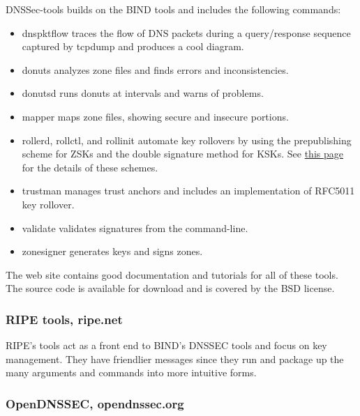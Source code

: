 DNSSec-tools builds on the BIND tools and includes the following
commands:

\begin{itemize}
\item
  {dnspktflow} traces the flow of DNS packets during a query/response
  sequence captured by {tcpdump} and produces a cool diagram.
\item
  {donuts} analyzes zone files and finds errors and inconsistencies.
\item
  {donutsd} runs {donuts} at intervals and warns of problems.
\item
  {mapper} maps zone files, showing secure and insecure portions.
\item
  {rollerd}, {rollctl}, and {rollinit} automate key rollovers by using
  the prepublishing scheme for ZSKs and the double signature method for
  KSKs. See
  \protect\hyperlink{part0024_split_066.htmlux5cux23_idTextAnchor947}{this
  page} for the details of these schemes.
\item
  {trustman} manages trust anchors and includes an implementation of
  RFC5011 key rollover.
\item
  {validate} validates signatures from the command-line.
\item
  {zonesigner} generates keys and signs zones.
\end{itemize}

The web site contains good documentation and tutorials for all of these
tools. The source code is available for download and is covered by the
BSD license.

\subsubsection[RIPE tools,
ripe.net]{\texorpdfstring{\protect\hypertarget{part0024_split_067.htmlux5cux23_idTextAnchor951}{}{}RIPE
tools, ripe.net}{RIPE tools, ripe.net}}

\protect\hypertarget{part0024_split_067.htmlux5cux23_idIndexMarker2276}{}{}RIPE's
tools act as a front end to BIND's DNSSEC tools and focus on key
management. They have friendlier messages since they run and package up
the many arguments and commands into more intuitive forms.

\subsubsection[OpenDNSSEC,
opendnssec.org]{\texorpdfstring{\protect\hypertarget{part0024_split_067.htmlux5cux23_idTextAnchor952}{}{}OpenDNSSEC,
opendnssec.org}{OpenDNSSEC, opendnssec.org}}

